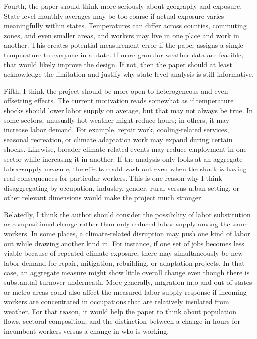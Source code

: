 \documentclass[12pt]{article}
\begin{document}
Fourth, the paper should think more seriously about geography and exposure. State-level monthly averages may be too coarse if actual exposure varies meaningfully within states. Temperatures can differ across counties, commuting zones, and even smaller areas, and workers may live in one place and work in another. This creates potential measurement error if the paper assigns a single temperature to everyone in a state. If more granular weather data are feasible, that would likely improve the design. If not, then the paper should at least acknowledge the limitation and justify why state-level analysis is still informative.

Fifth, I think the project should be more open to heterogeneous and even offsetting effects. The current motivation reads somewhat as if temperature shocks should lower labor supply on average, but that may not always be true. In some sectors, unusually hot weather might reduce hours; in others, it may increase labor demand. For example, repair work, cooling-related services, seasonal recreation, or climate adaptation work may expand during certain shocks. Likewise, broader climate-related events may reduce employment in one sector while increasing it in another. If the analysis only looks at an aggregate labor-supply measure, the effects could wash out even when the shock is having real consequences for particular workers. This is one reason why I think disaggregating by occupation, industry, gender, rural versus urban setting, or other relevant dimensions would make the project much stronger.

Relatedly, I think the author should consider the possibility of labor substitution or compositional change rather than only reduced labor supply among the same workers. In some places, a climate-related disruption may push one kind of labor out while drawing another kind in. For instance, if one set of jobs becomes less viable because of repeated climate exposure, there may simultaneously be new labor demand for repair, mitigation, rebuilding, or adaptation projects. In that case, an aggregate measure might show little overall change even though there is substantial turnover underneath. More generally, migration into and out of states or metro areas could also affect the measured labor-supply response if incoming workers are concentrated in occupations that are relatively insulated from weather. For that reason, it would help the paper to think about population flows, sectoral composition, and the distinction between a change in hours for incumbent workers versus a change in who is working.
\end{document}
